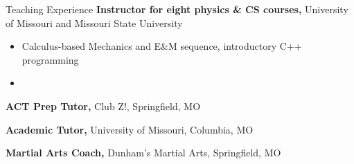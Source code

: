 

\begin{rubric}{Teaching Experience\hfill\hspace{2em}\RMPlogo}
    \entry*[2018 -- 2022]%
        \textbf{Instructor for eight physics \& CS courses,} University of Missouri and Missouri State University
        \begin{itemize}
            \item Calculus-based Mechanics and E\&M sequence, introductory C++ programming
            \item 
        \end{itemize}
    
    \entry*[2018 -- 2021]%
        \textbf{ACT Prep Tutor,} Club Z!, Springfield, MO
    
    \entry*[2021 -- Present]%
        \textbf{Academic Tutor,} University of Missouri, Columbia, MO
    
    \entry*[2014 -- 2020]%
        \textbf{Martial Arts Coach,} Dunham's Martial Arts, Springfield, MO
\end{rubric}
